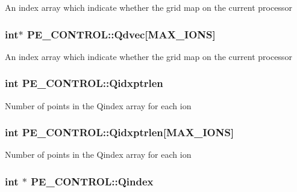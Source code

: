 An index array which indicate whether the grid map on the current processor \hypertarget{struct_p_e___c_o_n_t_r_o_l_a73f10b868acd3413804330b66909e6e7}{
\subsubsection[{Qdvec}]{\setlength{\rightskip}{0pt plus 5cm}int$\ast$ P\-E\-\_\-\-C\-O\-N\-T\-R\-O\-L\-::\-Qdvec\mbox{[}{\bf M\-A\-X\-\_\-\-I\-O\-N\-S}\mbox{]}}}\label{struct_p_e___c_o_n_t_r_o_l_a73f10b868acd3413804330b66909e6e7}
An index array which indicate whether the grid map on the current processor \hypertarget{struct_p_e___c_o_n_t_r_o_l_a741e9908706d4131a2ea63a7142c08f7}{
\subsubsection[{Qidxptrlen}]{\setlength{\rightskip}{0pt plus 5cm}int P\-E\-\_\-\-C\-O\-N\-T\-R\-O\-L\-::\-Qidxptrlen}}\label{struct_p_e___c_o_n_t_r_o_l_a741e9908706d4131a2ea63a7142c08f7}
Number of points in the Qindex array for each ion \hypertarget{struct_p_e___c_o_n_t_r_o_l_a3f73837ef56437187966fbca2d2c043a}{
\subsubsection[{Qidxptrlen}]{\setlength{\rightskip}{0pt plus 5cm}int P\-E\-\_\-\-C\-O\-N\-T\-R\-O\-L\-::\-Qidxptrlen\mbox{[}{\bf M\-A\-X\-\_\-\-I\-O\-N\-S}\mbox{]}}}\label{struct_p_e___c_o_n_t_r_o_l_a3f73837ef56437187966fbca2d2c043a}
Number of points in the Qindex array for each ion \hypertarget{struct_p_e___c_o_n_t_r_o_l_a361aa6dc417492377ae581666c787d2c}{
\subsubsection[{Qindex}]{\setlength{\rightskip}{0pt plus 5cm}int $\ast$ P\-E\-\_\-\-C\-O\-N\-T\-R\-O\-L\-::\-Qindex}}\label{struct_p_e___c_o_n_t_r_o_l_a361aa6dc417492377ae581666c787d2c}
